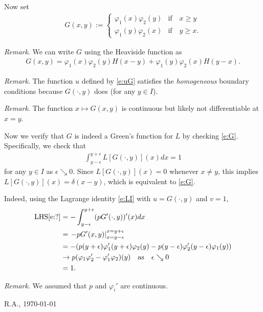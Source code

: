 \documentclass[12pt,a4paper]{article}
\begin{document}
    
    Now set
    \begin{align}
        G(x, y)
        :=
        \begin{cases}
            \varphi_1(x) \varphi_2(y) & \text{if} \quad x \geq y
            \\
            \varphi_1(y) \varphi_2(x) & \text{if} \quad y \geq x
            .
        \end{cases}
    \end{align}
    
    
    \emph{Remark}.
    We can write $G$ using the Heaviside function as
    \begin{align}
        G(x, y)
        =
        \varphi_1(x) \varphi_2(y) H(x - y)
        +
        \varphi_1(y) \varphi_2(x) H(y - x)
        .
    \end{align}

    
    \emph{Remark}.
    The function $u$ defined by \eqref{e:uG}
    satisfies the \emph{homogeneous} boundary conditions
    because
    $G(\cdot, y)$ does (for any $y \in I$).
    
    
    \emph{Remark}.
    The function $x \mapsto G(x, y)$ is 
    continuous but likely not differentiable at $x = y$.
    
    
    Now we verify that $G$ is indeed a Green's function 
    for $L$ by checking \eqref{e:G}.
    Specifically, we check that
    \begin{align}
        \label{e:?}
        \int_{y - \epsilon}^{y + \epsilon}
        L [G(\cdot, y)](x) dx
        =
        1
    \end{align}
    for any $y \in I$ as $\epsilon \searrow 0$.
    Since $L [G(\cdot, y)](x) = 0$ whenever $x \neq y$,
    this implies $L [G(\cdot, y)](x) = \delta(x - y)$,
    which is equivalent to \eqref{e:G}.

    Indeed,
    using the Lagrange identity \eqref{e:LI}
    with $u = G(\cdot, y)$ and $v = 1$,
    \begin{align}
        \text{LHS}\eqref{e:?}
        & =
        -
        \int_{y - \epsilon}^{y + \epsilon}
        (p G'(\cdot, y))'(x) 
        dx
        \\
        & =
        \left.
        - p G'(x, y)
        \right|_{x = y - \epsilon}^{x = y + \epsilon}
        \\
        & =
        -
        (
        p(y + \epsilon) \varphi_1'(y + \epsilon) \varphi_2(y)
        -
        p(y - \epsilon) \varphi_2'(y - \epsilon) \varphi_1(y)
        )
        \\
        & \to 
        p (\varphi_1 \varphi_2' - \varphi_1' \varphi_2)(y)
        \quad \text{as} \quad
        \epsilon \searrow 0
        \\
        & = 1
        .
    \end{align}

    \emph{Remark}.
    We assumed that $p$ and $\varphi_i'$ are continuous.
    
    
    
    \vfill\hfill 
    R.A., \today
\end{document}

